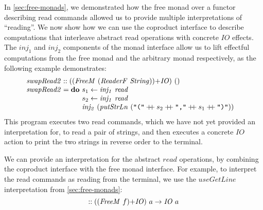 \documentclass{jfp1}
\newcommand{\fmext}[1]{\langle\langle #1 \rangle\rangle}
\newcommand{\kw}[1]{\textbf{#1}}
\begin{document}
In \autoref{sec:free-monads}, we demonstrated how the free monad over
a functor describing read commands allowed us to provide multiple
interpretations of ``reading''. We now show how we can use the
coproduct interface to describe computations that interleave abstract
read operations with concrete $\mathit{IO}$ effects. The
$\mathit{inj_1}$ and $\mathit{inj_2}$ components of the monad
interface allow us to lift effectful computations from the free monad
and the arbitrary monad respectively, as the following example
demonstrates:
\begin{displaymath}
  \begin{array}{@{}l}
    \mathit{swapRead2} :: (\cprd{(\mathit{FreeM}~(\mathit{ReaderF}~\mathit{String}))}{\mathit{IO}})~() \\
    \mathit{swapRead2} = \kw{do}~
    \begin{array}[t]{@{}l}
      s_1 \leftarrow \mathit{inj_1}~\mathit{read} \\
      s_2 \leftarrow \mathit{inj_1}~\mathit{read} \\
      \mathit{inj_2}~(\mathit{putStrLn}~(\texttt{"("} \dplus s_2 \dplus \texttt{","} \dplus s_1 \dplus \texttt{")"}))
    \end{array}
  \end{array}
\end{displaymath}
This program executes two read commands, which we have not yet
provided an interpretation for, to read a pair of strings, and then
executes a concrete $\mathit{IO}$ action to print the two strings in
reverse order to the terminal.

We can provide an interpretation for the abstract $\mathit{read}$
operations, by combining the coproduct interface with the free monad
interface. For example, to interpret the read commands as reading from
the terminal, we use the $\mathit{useGetLine}$ interpretation from
\autoref{sec:free-monads}:
\begin{displaymath}
  [\fmext{\mathit{useGetLine}}, \mathit{id}] :: (\cprd{(\mathit{FreeM}~f)}{\mathit{IO}})~a \to \mathit{IO}~a
\end{displaymath}
\end{document}
